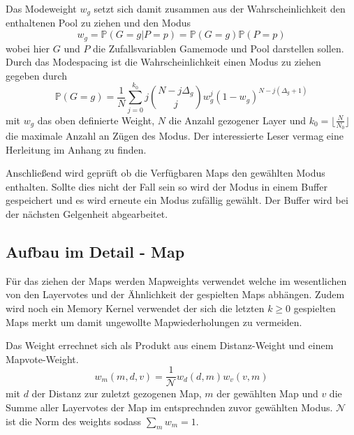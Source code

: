         Das Modeweight $w_g$ setzt sich damit zusammen aus der Wahrscheinlichkeit den enthaltenen Pool zu ziehen und den Modus 
        \begin{equation}
            w_g = \mathbb{P}(G=g|P=p) = \mathbb{P}(G=g)\mathbb{P}(P=p)
        \end{equation}
        wobei hier $G$ und $P$ die Zufallsvariablen \glqq{}Gamemode\grqq{} und \glqq{}Pool\grqq{} darstellen sollen.
        Durch das Modespacing ist die Wahrscheinlichkeit einen Modus zu ziehen gegeben durch 
        \begin{equation}
            \label{eq:Modeweight}
            \mathbb{P}(G=g) = \frac{1}{N}\sum_{j=0}^{k_0}j\binom{N-j \Delta_g}{j}w_g^j(1-w_g)^{N-j(\Delta_g+1)}
        \end{equation}
        mit $w_g$ das oben definierte Weight, $N$ die Anzahl gezogener Layer und $k_0=\lfloor\frac{N}{N_0}\rfloor$ die maximale Anzahl an Zügen des Modus.
        Der interessierte Leser vermag eine Herleitung im Anhang zu finden.

        Anschließend wird geprüft ob die Verfügbaren Maps den gewählten Modus enthalten. Sollte dies nicht der Fall sein so wird der Modus in einem Buffer gespeichert und es wird erneute ein Modus zufällig gewählt. 
        Der Buffer wird bei der nächsten Gelgenheit abgearbeitet.
    \subsection{Aufbau im Detail - Map}
    \label{sub:AufbauImDetail-Map}
        Für das ziehen der Maps werden Mapweights verwendet welche im wesentlichen von den Layervotes und der \glqq{}Ähnlichkeit\grqq{} der gespielten Maps abhängen.
        Zudem wird noch ein Memory Kernel verwendet der sich die letzten $k\geq 0$ gespielten Maps merkt um damit ungewollte Mapwiederholungen zu vermeiden.

        Das Weight errechnet sich als Produkt aus einem \glqq{}Distanz-Weight\grqq{} und einem \glqq{}Mapvote-Weight\grqq{}. 
        \begin{equation}
            w_m(m,d,v) = \frac{1}{\mathcal{N}}w_d(d,m)w_v(v,m)
        \end{equation}
        mit $d$ der Distanz zur zuletzt gezogenen Map, $m$ der gewählten Map und $v$ die Summe aller Layervotes der Map im entsprechnden zuvor gewählten Modus.
        $\mathcal{N}$ ist die Norm des weights sodass $\sum_m w_m = 1$.
